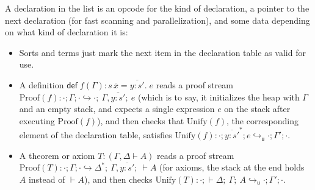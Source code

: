 \documentclass[runningheads]{llncs}
\newcommand{\hto}{\hookrightarrow}
\newcommand{\uto}{\hookrightarrow_{\mathsf{u}}}
\begin{document}


A declaration in the list is an opcode for the kind of declaration, a pointer to the next declaration (for fast scanning and parallelization), and some data depending on what kind of declaration it is:
\begin{itemize}
  \item Sorts and terms just mark the next item in the declaration table as valid for use.
  \item A definition $\mathsf{def}\;f(\Gamma):s\,\overline{x}=\overline{y:s'}.\;e$ reads a proof stream $\mathrm{Proof}(f){:{}}\cdot;\Gamma;\cdot\hto\cdot;\ \Gamma,\overline{y:s'};\ e$ (which is to say, it initializes the heap with $\Gamma$ and an empty stack, and expects a single expression $e$ on the stack after executing $\mathrm{Proof}(f)$), and then checks that $\mathrm{Unify}(f)$, the corresponding element of the declaration table, satisfies $\mathrm{Unify}(f){:{}}\cdot;\overline{y:s'}^*;e\uto \cdot;\Gamma';\cdot$.
  \item A theorem or axiom $T:(\Gamma,\Delta\vdash A)$ reads a proof stream $\mathrm{Proof}(T){:{}}\cdot;\Gamma;\cdot\hto \Delta^*;\ \Gamma,\overline{y:s'};\ {{\vdash} A}$ (for axioms, the stack at the end holds $A$ instead of ${\vdash} A$), and then checks $\mathrm{Unify}(T){:{}}\cdot;{{\vdash}\Delta};\ \Gamma;\ A\uto \cdot;\Gamma';\cdot$.
\end{itemize}
\end{document}
